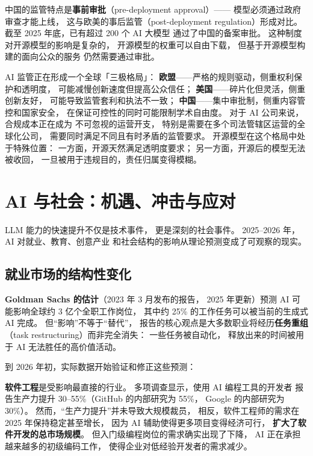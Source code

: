 中国的监管特点是\textbf{事前审批}（pre-deployment approval）——
模型必须通过政府审查才能上线，
这与欧美的事后监管（post-deployment regulation）形成对比。
截至 2025 年底，已有超过 200 个 AI 大模型
通过了中国的备案审批。
这种制度对开源模型的影响是复杂的，
开源模型的权重可以自由下载，
但基于开源模型构建的面向公众的服务
仍然需要通过审批。

\begin{warnbox}
AI 监管正在形成一个全球「三极格局」：
\textbf{欧盟}——严格的规则驱动，侧重权利保护和透明度，
可能减慢创新速度但提高公众信任；
\textbf{美国}——碎片化但灵活，侧重创新友好，
可能导致监管套利和执法不一致；
\textbf{中国}——集中审批制，侧重内容管控和国家安全，
在保证可控性的同时可能限制学术自由度。
对于 AI 公司来说，合规成本正在成为
不可忽视的运营开支，
特别是需要在多个司法管辖区运营的全球化公司，
需要同时满足不同且有时矛盾的监管要求。
开源模型在这个格局中处于特殊位置：
一方面，开源天然满足透明度要求；
另一方面，开源后的模型无法被收回，
一旦被用于违规目的，责任归属变得模糊。
\end{warnbox}

\section{AI 与社会：机遇、冲击与应对}
\label{sec:ai-and-society}

LLM 能力的快速提升不仅是技术事件，
更是深刻的社会事件。
2025--2026 年，AI 对就业、教育、创意产业
和社会结构的影响从理论预测变成了可观察的现实。

\subsection{就业市场的结构性变化}

\textbf{Goldman Sachs 的估计}（2023 年 3 月发布的报告，
2025 年更新）预测 AI 可能影响全球约 3 亿个全职工作岗位，
其中约 25\% 的工作任务可以被当前的生成式 AI 完成。
但“影响”不等于“替代”，
报告的核心观点是大多数职业将经历\textbf{任务重组}
（task restructuring）而非完全消失：
一些任务被自动化，
释放出来的时间被用于 AI 无法胜任的高价值活动。

到 2026 年初，实际数据开始验证和修正这些预测：

\textbf{软件工程}是受影响最直接的行业。
多项调查显示，使用 AI 编程工具的开发者
报告生产力提升 30--55\%（GitHub 的内部研究为 55\%，
Google 的内部研究为 30\%）。
然而，“生产力提升”并未导致大规模裁员，
相反，软件工程师的需求在 2025 年保持稳定甚至增长，
因为 AI 辅助使得更多项目变得经济可行，
\textbf{扩大了软件开发的总市场规模}。
但入门级编程岗位的需求确实出现了下降，
AI 正在承担越来越多的初级编码工作，
使得企业对低经验开发者的需求减少。

